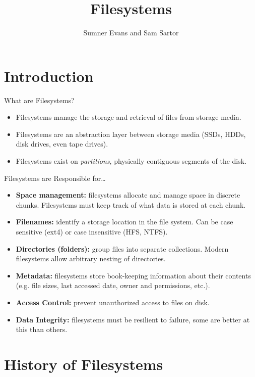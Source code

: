 \documentclass{lug}
\title{Filesystems}
\author{Sumner Evans and Sam Sartor}
\institute{Mines Linux Users Group}
\begin{document}
\section{Introduction}

\begin{frame}{What are Filesystems?}
    \begin{itemize}
        \item Filesystems manage the storage and retrieval of files from storage
            media.
        \item Filesystems are an abstraction layer between storage media (SSDs,
            HDDs, disk drives, even tape drives).
        \item Filesystems exist on \textit{partitions}, physically contiguous
            segments of the disk.
    \end{itemize}
\end{frame}

\begin{frame}{Filesystems are Responsible for\ldots}
    \begin{itemize}
        \item \textbf{Space management:} filesystems allocate and manage space
            in discrete chunks. Filesystems must keep track of what data is
            stored at each chunk.
        \item \textbf{Filenames:} identify a storage location in the file
            system. Can be case sensitive (ext4) or case insensitive (HFS,
            NTFS).
        \item \textbf{Directories (folders):} group files into separate
            collections. Modern filesystems allow arbitrary nesting of
            directories.
        \item \textbf{Metadata:} filesystems store book-keeping information
            about their contents (e.g. file sizes, last accessed date, owner and
            permissions, etc.).
        \item \textbf{Access Control:} prevent unauthorized access to files on
            disk.
        \item \textbf{Data Integrity:} filesystems must be resilient to failure,
            some are better at this than others.
    \end{itemize}
\end{frame}

\section{History of Filesystems}
\end{document}
